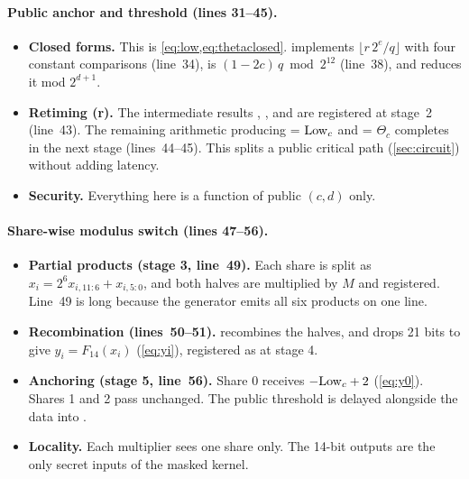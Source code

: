 \paragraph{Public anchor and threshold (lines 31--45).}\leavevmode\par

\begin{itemize}
  \item \textbf{Closed forms.} This is \cref{eq:low,eq:thetaclosed}.  implements $\lfloor r\,2^{e}/q \rfloor$ with four constant comparisons (line~34),  is $(1 - 2c)\,q \bmod 2^{12}$ (line~38), and  reduces it mod $2^{d+1}$.
  \item \textbf{Retiming (r).} The intermediate results , ,  and  are registered at stage~2 (line~43). The remaining arithmetic producing  = $\mathrm{Low}_c$ and  = $\Theta_c$ completes in the next stage (lines~44--45). This splits a public critical path (\cref{sec:circuit}) without adding latency.
  \item \textbf{Security.} Everything here is a function of public $(c, d)$ only.
\end{itemize}

\paragraph{Share-wise modulus switch (lines 47--56).}\leavevmode\par

\begin{itemize}
  \item \textbf{Partial products (stage 3, line~49).} Each share is split as $x_i = 2^6 x_{i,11:6} + x_{i,5:0}$, and both halves are multiplied by $M$ and registered. Line~49 is long because the generator emits all six products on one line.
  \item \textbf{Recombination (lines~50--51).}  recombines the halves, and  drops 21 bits to give $y_i = F_{14}(x_i)$ (\cref{eq:yi}), registered as  at stage 4.
  \item \textbf{Anchoring (stage 5, line~56).} Share 0 receives $-\mathrm{Low}_c + 2$ (\cref{eq:y0}). Shares 1 and 2 pass unchanged. The public threshold is delayed alongside the data into .
  \item \textbf{Locality.} Each multiplier sees one share only. The 14-bit outputs  are the only secret inputs of the masked kernel.
\end{itemize}

